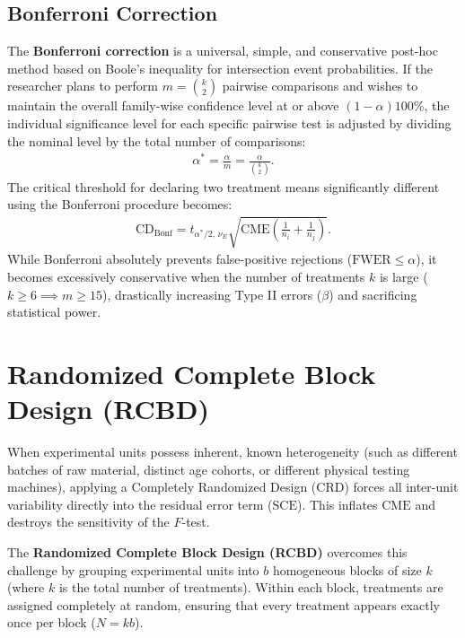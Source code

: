 \subsection{Bonferroni Correction}
The \textbf{Bonferroni correction} is a universal, simple, and conservative post-hoc method based on Boole's inequality for intersection event probabilities. If the researcher plans to perform $m = \binom{k}{2}$ pairwise comparisons and wishes to maintain the overall family-wise confidence level at or above $(1-\alpha)100\%$, the individual significance level for each specific pairwise test is adjusted by dividing the nominal level by the total number of comparisons:
\begin{align}
	\alpha^* = \frac{\alpha}{m} = \frac{\alpha}{\binom{k}{2}}.
\end{align}
The critical threshold for declaring two treatment means significantly different using the Bonferroni procedure becomes:
\begin{align}
	\text{CD}_{\text{Bonf}} = t_{\alpha^*/2, \, \nu_E} \sqrt{\text{CME} \left( \frac{1}{n_i} + \frac{1}{n_j} \right)}.
\end{align}
While Bonferroni absolutely prevents false-positive rejections ($\text{FWER} \leq \alpha$), it becomes excessively conservative when the number of treatments $k$ is large ($k \geq 6 \implies m \geq 15$), drastically increasing Type II errors ($\beta$) and sacrificing statistical power.

\section{Randomized Complete Block Design (RCBD)}

When experimental units possess inherent, known heterogeneity (such as different batches of raw material, distinct age cohorts, or different physical testing machines), applying a Completely Randomized Design (CRD) forces all inter-unit variability directly into the residual error term ($\text{SCE}$). This inflates $\text{CME}$ and destroys the sensitivity of the $F$-test.

The \textbf{Randomized Complete Block Design (RCBD)} overcomes this challenge by grouping experimental units into $b$ homogeneous blocks of size $k$ (where $k$ is the total number of treatments). Within each block, treatments are assigned completely at random, ensuring that every treatment appears exactly once per block ($N = kb$).

